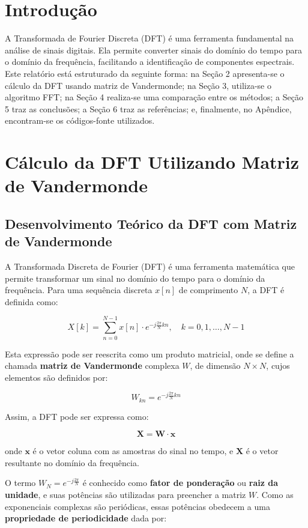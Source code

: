 \documentclass[12pt]{article}
\begin{document}
\tableofcontents


\newpage
\section{Introdução}

A Transformada de Fourier Discreta (DFT) é uma ferramenta fundamental na análise de sinais digitais. Ela permite converter sinais do domínio do tempo para o domínio da frequência, facilitando a identificação de componentes espectrais. Este relatório está estruturado da seguinte forma: na Seção 2 apresenta-se o cálculo da DFT usando matriz de Vandermonde; na Seção 3, utiliza-se o algoritmo FFT; na Seção 4 realiza-se uma comparação entre os métodos; a Seção 5 traz as conclusões; a Seção 6 traz as referências; e, finalmente, no Apêndice, encontram-se os códigos-fonte utilizados.


\newpage
\section{Cálculo da DFT Utilizando Matriz de Vandermonde}

\subsection{Desenvolvimento Teórico da DFT com Matriz de Vandermonde}

A Transformada Discreta de Fourier (DFT) é uma ferramenta matemática que permite transformar um sinal no domínio do tempo para o domínio da frequência. Para uma sequência discreta $x[n]$ de comprimento $N$, a DFT é definida como:

\[
X[k] = \sum_{n=0}^{N-1} x[n] \cdot e^{-j\frac{2\pi}{N}kn}, \quad k = 0, 1, \dots, N-1
\]

Esta expressão pode ser reescrita como um produto matricial, onde se define a chamada \textbf{matriz de Vandermonde} complexa $W$, de dimensão $N \times N$, cujos elementos são definidos por:

\[
W_{kn} = e^{-j\frac{2\pi}{N}kn}
\]

Assim, a DFT pode ser expressa como:

\[
\mathbf{X} = \mathbf{W} \cdot \mathbf{x}
\]

onde $\mathbf{x}$ é o vetor coluna com as amostras do sinal no tempo, e $\mathbf{X}$ é o vetor resultante no domínio da frequência.

O termo $W_N = e^{-j\frac{2\pi}{N}}$ é conhecido como \textbf{fator de ponderação} ou \textbf{raiz da unidade}, e suas potências são utilizadas para preencher a matriz $W$. Como as exponenciais complexas são periódicas, essas potências obedecem a uma \textbf{propriedade de periodicidade} dada por:
\end{document}
